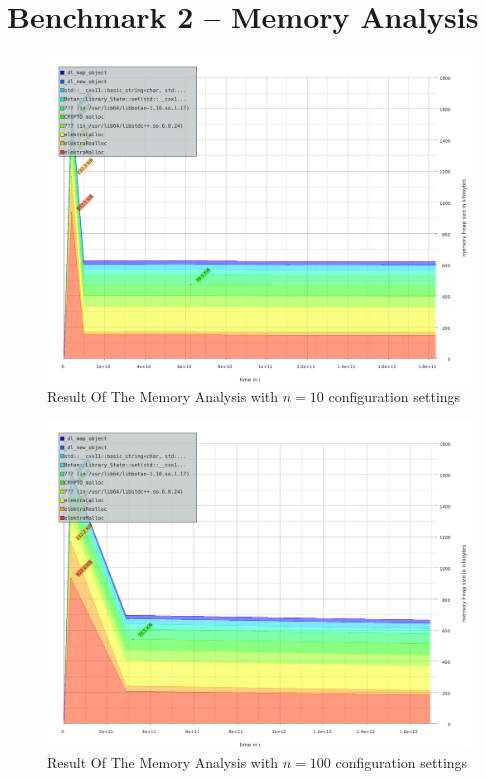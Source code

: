 \section{Benchmark 2 -- Memory Analysis}

\begin{figure}[h]
\center
\caption{Result Of The Memory Analysis with $n = 10$ configuration settings}
\label{eval-massif-010}
\includegraphics[width=\columnwidth]{plots/massif_010.pdf}
\end{figure}

\begin{figure}[h]
\center
\caption{Result Of The Memory Analysis with $n = 100$ configuration settings}
\label{eval-massif-100}
\includegraphics[width=\columnwidth]{plots/massif_100.pdf}
\end{figure}


